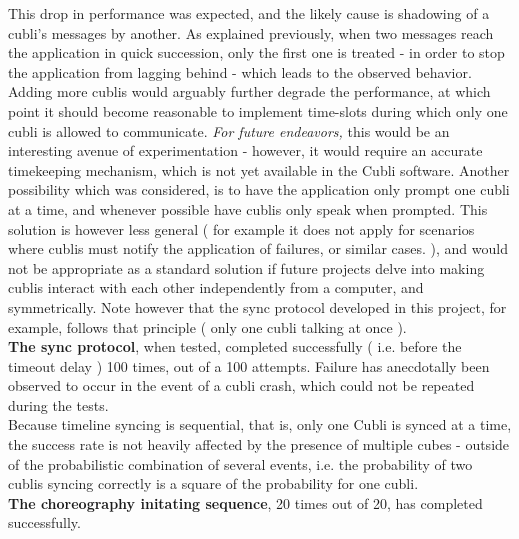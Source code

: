 This drop in performance was expected, and the likely cause is shadowing of a cubli's messages by another. As explained previously, when two messages reach the application in quick succession, only the first one is treated - in order to stop the application from lagging behind - which leads to the observed behavior. \\

Adding more cublis would arguably further degrade the performance, at which point it should become reasonable to implement time-slots during which only one cubli is allowed to communicate. \textit{ For future endeavors, } this would be an interesting avenue of experimentation - however, it would require an accurate timekeeping mechanism, which is not yet available in the Cubli software. Another possibility which was considered, is to have the application only prompt one cubli at a time, and whenever possible have cublis only speak when prompted. This solution is however less general ( for example it does not apply for scenarios where cublis must notify the application of failures, or similar cases. ), and would not be appropriate as a standard solution if future projects delve into making cublis interact with each other independently from a computer, and symmetrically. Note however that the sync protocol developed in this project, for example, follows that principle ( only one cubli talking at once ). \\

\textbf{The sync protocol}, when tested, completed successfully ( i.e. before the timeout delay ) 100 times, out of a 100 attempts. Failure has anecdotally been observed to occur in the event of a cubli crash, which could not be repeated during the tests.\\

Because timeline syncing is sequential, that is, only one Cubli is synced at a time, the success rate is not heavily affected by the presence of multiple cubes - outside of the probabilistic combination of several events, i.e. the probability of two cublis syncing correctly is a square of the probability for one cubli.\\

\textbf{The choreography initating sequence}, 20 times out of 20, has completed successfully.

